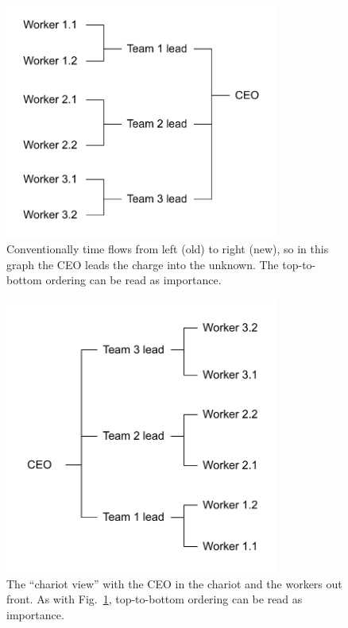\begin{figure}
\includegraphics[width=0.8\textwidth]{images/org-chart-orientation-ceo-leads.pdf}
\caption{Conventionally time flows from left (old) to right (new), so in this graph the CEO leads the charge into the unknown. The top-to-bottom ordering can be read as importance. }
\label{org_chart_orientation_ceo-leads}
\end{figure}

\begin{figure}
\includegraphics[width=0.8\textwidth]{images/org-chart-orientation-workers-lead.pdf}
\caption{The ``chariot view'' with the CEO in the chariot and the workers out front. As with Fig.~\ref{org_chart_orientation_ceo-leads}, top-to-bottom ordering can be read as importance. }
\label{org_chart_orientation_ceo-follows}
\end{figure}
